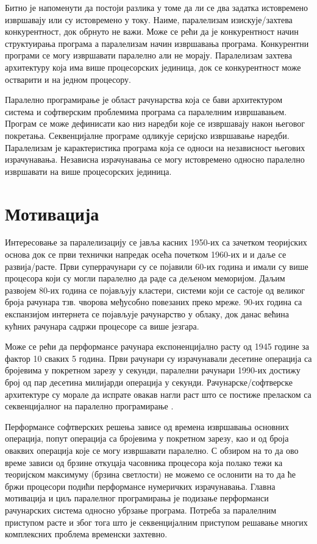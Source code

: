 \documentclass[12pt,oneside]{memoir}
\begin{document}
Битно је напоменути да постоји разлика у томе да ли се два задатка истовремено извршавају или су истовремено у току. Наиме, паралелизам изискује/захтева конкурентност, док обрнуто не важи. Може се рећи да је конкурентност начин структуирања програма а паралелизам начин извршавања програма. Конкурентни програми се могу извршавати паралелно али не морају. Паралелизам захтева архитектуру која има више процесорских јединица, док се конкурентност може остварити и на једном процесору.

 	Паралелно програмирање је област рачунарства која се бави архитектуром система и софтверским проблемима програма са паралелним извршавањем. Програм се може дефинисати као низ наредби које се извршавају након његовог покретања. Секвенцијалне програме одликује серијско извршавање наредби. Паралелизам је карактеристика програма која се односи на независност његових израчунавања. Независна израчунавања се могу истовремено односно паралелно извршавати на више процесорских јединица.
  \section{Мотивација}
  Интересовање за паралелизацију се јавља касних 1950-их са зачетком теоријских основа док се први технички напредак осећа почетком 1960-их и и даље се развија/расте. Први суперрачунари су се појавили 60-их година и имали су више процесора који су могли паралелно да раде са дељеном меморијом. Даљим развојем 80-их година се појављују кластери, системи који се састоје од великог броја рачунара тзв. чворова међусобно повезаних преко мреже. 90-их година са експанзијом интернета се појављује рачунарство у облаку, док данас већина кућних рачунара садржи процесоре са више језгара. 
  
   Може се рећи да перформансе рачунара експоненцијално расту од 1945 године за фактор 10 сваких 5 година. Први рачунари су израчунавали десетине операција са бројевима у покретном зарезу у секунди, паралелни рачунари 1990-их достижу број од пар десетина милијарди операција у секунди. Рачунарске/софтверске архитектуре су морале да испрате овакав нагли раст што се постиже преласком са секвенцијалног на паралелно програмирање \cite{par_history}.
   
    Перформансе софтверских решења зависе од времена извршавања основних операција, попут операција са бројевима у покретном зарезу, као и од броја оваквих операција које се могу извршавати паралелно. С обзиром на то да ово време зависи од брзине откуцаја часовника процесора која полако тежи ка теоријском максимуму (брзина светлости) не можемо се ослонити на то да ће бржи процесори подићи перформансе нумеричких израчунавања. Главна мотивација и циљ паралелног програмирања је подизање перформанси рачунарских система односно убрзање програма. Потреба за паралелним приступом расте и због тога што је секвенцијалним приступом решавање многих комплексних проблема временски захтевно.
    
\end{document}
